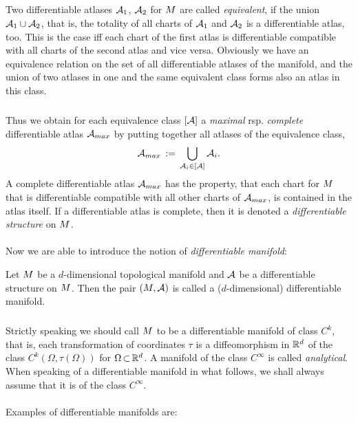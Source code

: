 \documentclass[11pt,twoside]{article}
\begin{document}
\subparagraph{}
Two differentiable atlases ${\cal{A}}_1$, ${\cal{A}}_2$ for $\topM$
are called \textit{equivalent},
if the union ${\cal{A}}_1 \cup {\cal{A}}_2$,
that is,
the totality of all charts of ${\cal{A}}_1$ and ${\cal{A}}_2$
is a differentiable atlas,
too.
This is the case
iff each chart of the first atlas is differentiable compatible
with all charts of the second atlas and vice versa.
Obviously we have an equivalence relation on the set
of all differentiable atlases of the manifold,
and the union of two atlases in one and the same equivalent class
forms also an atlas in this class.

\subparagraph{}
Thus we obtain for each equivalence class $[{\cal{A}}]$ a \textit{maximal}
rsp. \textit{complete} differentiable atlas ${\cal{A}}_{max}$
by putting together all atlases of the equivalence class,
\[
{\cal{A}}_{max} \eqdef
\bigcup_{{\cal{A}}_i \in [{\cal{A}}]} {\cal{A}}_i.
\]
A complete differentiable atlas $\cal{A}_{max}$ has the property,
that each chart for $\topM$
that is differentiable compatible with all other charts of $\cal{A}_{max}$,
is contained in the atlas itself.
If a differentiable atlas is complete,
then it is denoted a \textit{differentiable structure} on $\topM$.

\paragraph{}
Now we are able to introduce the notion of \textit{differentiable manifold}:

\begin{definition}
Let $\topM$ be a $d$-dimensional topological manifold
and $\cal{A}$ be a differentiable structure on $\topM$.
Then the pair $(\topM,\cal{A})$ is called
a ($d$-dimensional) differentiable manifold.
\end{definition}

\subparagraph{}
Strictly speaking we should call $\topM$ to be a differentiable manifold
of class $C^k$,
that is,
each transformation of coordinates $\tau$ is a diffeomorphism
in $\Rd$ of the class $C^k(\Omega,\tau(\Omega))$ for $\Omega \xsubset \Rd$.
A manifold of the class $C^{\infty}$ is called \textit{analytical}.
When speaking of a differentiable manifold in what follows,
we shall always assume that it is of the class $C^{\infty}$.

\paragraph{}
Examples of differentiable manifolds are:
\end{document}
